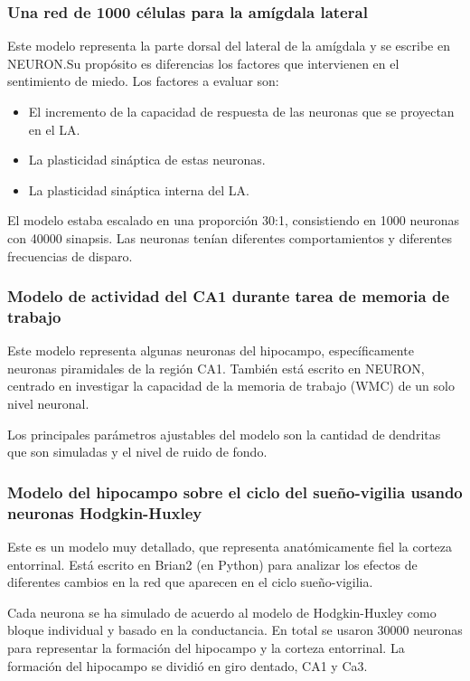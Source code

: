 \documentclass[12pt, letterpaper]{article}
\begin{document}
\subsubsection{Una red de 1000 células para la amígdala lateral}
Este modelo representa la parte dorsal del lateral de la amígdala y se escribe en NEURON.\@ Su propósito es diferencias los factores que intervienen en el sentimiento de miedo. Los factores a evaluar son:
\begin{itemize}
    \item El incremento de la capacidad de respuesta de las neuronas que se proyectan en el LA.\@
    \item La plasticidad sináptica de estas neuronas.
    \item La plasticidad sináptica interna del LA.\@
\end{itemize}

El modelo estaba escalado en una proporción 30:1, consistiendo en 1000 neuronas con 40000 sinapsis. Las neuronas tenían diferentes comportamientos y diferentes frecuencias de disparo. 

\subsubsection{Modelo de actividad del CA1 durante tarea de memoria de trabajo}
Este modelo representa algunas neuronas del hipocampo, específicamente neuronas piramidales de la región CA1. También está escrito en NEURON, centrado en investigar la capacidad de la memoria de trabajo (WMC) de un solo nivel neuronal.

Los principales parámetros ajustables del modelo son la cantidad de dendritas que son simuladas y el nivel de ruido de fondo. 

\subsubsection{Modelo del hipocampo sobre el ciclo del sueño-vigilia usando neuronas Hodgkin-Huxley}
Este es un modelo muy detallado, que representa anatómicamente fiel la corteza entorrinal. Está escrito en Brian2 (en Python) para analizar los efectos de diferentes cambios en la red que aparecen en el ciclo sueño-vigilia. 

Cada neurona se ha simulado de acuerdo al modelo de Hodgkin-Huxley como bloque individual y basado en la conductancia. En total se usaron 30000 neuronas para representar la formación del hipocampo y la corteza entorrinal. La formación del hipocampo se dividió en giro dentado, CA1 y Ca3.
\end{document}

